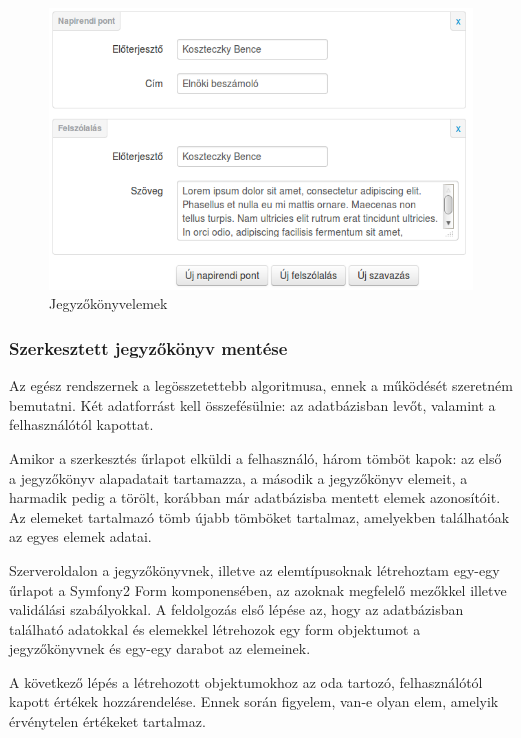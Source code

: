\documentclass[a4paper,12pt,oneside]{report}
\begin{document}
\begin{figure}[h]
    \centering
    \includegraphics[width=\textwidth]{jegyzokonyv_szerkesztes.png}
    \caption{Jegyzőkönyvelemek}
    \label{fig:jegyzokonyv_szerkesztes}
\end{figure}

\subsubsection*{Szerkesztett jegyzőkönyv mentése}

Az egész rendszernek a legösszetettebb algoritmusa, ennek a működését szeretném bemutatni. Két adatforrást kell összefésülnie: az adatbázisban levőt, valamint a felhasználótól kapottat.

Amikor a szerkesztés űrlapot elküldi a felhasználó, három tömböt kapok: az első a jegyzőkönyv alapadatait tartamazza, a második a jegyzőkönyv elemeit, a harmadik pedig a törölt, korábban már adatbázisba mentett elemek azonosítóit. Az elemeket tartalmazó tömb újabb tömböket tartalmaz, amelyekben találhatóak az egyes elemek adatai.

Szerveroldalon a jegyzőkönyvnek, illetve az elemtípusoknak létrehoztam egy-egy űrlapot a Symfony2 Form komponensében, az azoknak megfelelő mezőkkel illetve validálási szabályokkal. A feldolgozás első lépése az, hogy az adatbázisban található adatokkal és elemekkel létrehozok egy form objektumot a jegyzőkönyvnek és egy-egy darabot az elemeinek.

A következő lépés a létrehozott objektumokhoz az oda tartozó, felhasználótól kapott értékek hozzárendelése. Ennek során figyelem, van-e olyan elem, amelyik érvénytelen értékeket tartalmaz.
\end{document}
